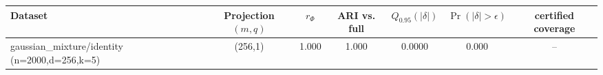 \begin{tabular}{lcccccc}
\toprule
Dataset & Projection $(m,q)$ & $r_\Phi$ & ARI vs. full & $Q_{0.95}(|\delta|)$ & $\Pr(|\delta|>\epsilon)$ & certified coverage \\
\midrule
gaussian\_mixture/identity (n=2000,d=256,k=5) & (256,1) & 1.000 & 1.000 & 0.0000 & 0.000 & -- \\
\bottomrule
\end{tabular}
